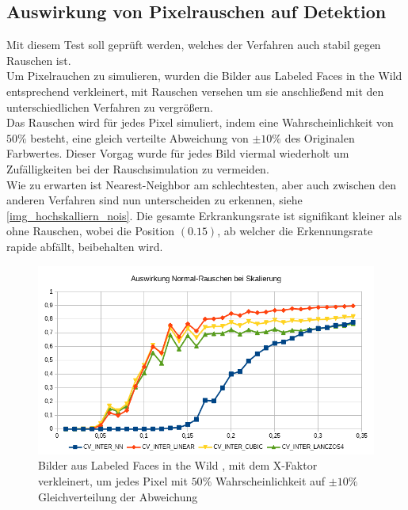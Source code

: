 \subsection{Auswirkung von Pixelrauschen auf Detektion}
Mit diesem Test soll geprüft werden, welches der Verfahren auch stabil gegen Rauschen ist.\\
Um Pixelrauchen zu simulieren, wurden die Bilder aus Labeled Faces in the Wild \cite{database_Face} entsprechend verkleinert, mit Rauschen versehen um sie anschließend mit den unterschiedlichen Verfahren zu vergrößern.\\
Das Rauschen wird für jedes Pixel simuliert, indem eine Wahrscheinlichkeit von $50\%$ besteht, eine gleich verteilte Abweichung von $\pm 10\%$ des Originalen Farbwertes. Dieser Vorgag wurde für jedes Bild viermal wiederholt um Zufälligkeiten bei der Rauschsimulation zu vermeiden.\\
Wie zu erwarten ist Nearest-Neighbor am schlechtesten, aber auch zwischen den anderen Verfahren sind nun unterscheiden zu erkennen, siehe \autoref{img_hochskalliern_nois}. Die gesamte Erkrankungsrate ist signifikant kleiner als ohne Rauschen, wobei die Position $(0.15)$, ab welcher die Erkennungsrate rapide abfällt, beibehalten wird.
\begin{figure}
	\centering
	\includegraphics[width=0.7\linewidth]{img/Hochskalliern_Nois}
	\caption{Bilder aus Labeled Faces in the Wild \cite{database_Face}, mit dem X-Faktor verkleinert, um jedes Pixel mit $50\%$ Wahrscheinlichkeit auf $\pm 10\%$ Gleichverteilung der Abweichung}
	\label{img_hochskalliern_nois}
\end{figure}
